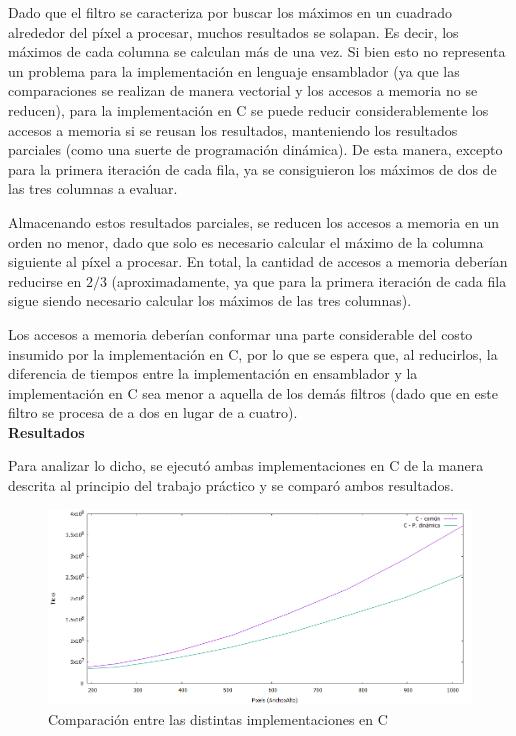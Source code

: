 \documentclass[a4paper]{article}
\begin{document}
Dado que el filtro se caracteriza por buscar los máximos en un cuadrado alrededor del píxel a procesar, muchos resultados se solapan. Es decir, los máximos de cada columna se calculan más de una vez. Si bien esto no representa un problema para la implementación en lenguaje ensamblador (ya que las comparaciones se realizan de manera vectorial y los accesos a memoria no se reducen), para la implementación en C se puede reducir considerablemente los accesos a memoria si se reusan los resultados, manteniendo los resultados parciales (como una suerte de programación dinámica). De esta manera, excepto para la primera iteración de cada fila, ya se consiguieron los máximos de dos de las tres columnas a evaluar.

Almacenando estos resultados parciales, se reducen los accesos a memoria en un orden no menor, dado que solo es necesario calcular el máximo de la columna siguiente al píxel a procesar. En total, la cantidad de accesos a memoria deberían reducirse en $2/3$ (aproximadamente, ya que para la primera iteración de cada fila sigue siendo necesario calcular los máximos de las tres columnas).

Los accesos a memoria deberían conformar una parte considerable del costo insumido por la implementación en C, por lo que se espera que, al reducirlos, la diferencia de tiempos entre la implementación en ensamblador y la implementación en C sea menor a aquella de los demás filtros (dado que en este filtro se procesa de a dos en lugar de a cuatro).
\\
\textbf{Resultados}

Para analizar lo dicho, se ejecutó ambas implementaciones en C de la manera descrita al principio del trabajo práctico y se comparó ambos resultados.
\\
\begin{figure}[H]
  \begin{center}
	\includegraphics[scale=0.66]{imagenes/colorizarExp.png}
	\caption{Comparación entre las distintas implementaciones en C}
	\label{colorizar_exp}
  \end{center}
\end{figure}
\end{document}
